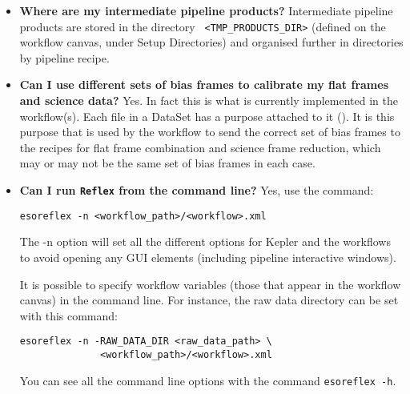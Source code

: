 \begin{itemize}
   \item {\bf Where are my intermediate pipeline products?}
   Intermediate pipeline products are stored in the directory {\tt
   \verb|<|TMP\_PRODUCTS\_DIR\verb|>|} (defined on the workflow
 canvas, under Setup Directories)
   and organised further in directories by pipeline recipe.


        

   \item {\bf Can I use different sets of bias frames to calibrate my
          flat frames and science data?}
   Yes. In fact this is what is currently implemented in the workflow(s).
   Each file in a DataSet has a purpose attached to it (\cite{REFLEXMAN}).
   It is this purpose that is used by the workflow to send the correct
   set of bias frames to the recipes for flat frame combination and 
   science frame reduction, which may or may not be the same set of bias 
   frames in each case.

   \item {\bf Can I run {\tt Reflex} from the command line?}
   Yes, use the command:
\begin{verbatim}
esoreflex -n <workflow_path>/<workflow>.xml
\end{verbatim}
   The -n option will set all the different options for Kepler and the
   workflows to avoid opening any GUI elements (including
   pipeline interactive windows).

   It is possible to specify workflow variables (those that appear in
   the workflow canvas) in the command line. For instance, the raw
   data directory can be set with this command:
\begin{verbatim}
esoreflex -n -RAW_DATA_DIR <raw_data_path> \
              <workflow_path>/<workflow>.xml
\end{verbatim}
   You can see all the command line options with the command 
   {\tt esoreflex -h}.


\end{itemize}
